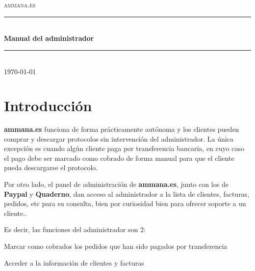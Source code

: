 \documentclass[12pt, spanish]{article}
\begin{document}

    \begin{titlepage}
        \newcommand { \HRule } { \rule {\linewidth} {0.5mm} }
        \center
        \textsc {\LARGE ammana.es} \\ [1.5cm]
        \HRule \\ [0.4cm]
        { \huge \bfseries Manual del administrador } \\ [0.4cm]
        \HRule \\ [1.5cm]
        { \large \today } \\ [3cm]
        \vfill
    \end{titlepage}


    \tableofcontents

    \newpage

    \section{Introducción}

        \textbf{ammana.es} funciona de forma prácticamente autónoma y los clientes pueden
        comprar y descargar protocolos sin intervención del administrador. La única
        excepción es cuando algún cliente paga por transferencia bancaria, en cuyo
        caso el pago debe ser marcado como cobrado de forma manual para que el cliente
        pueda descargarse el protocolo.

        Por otro lado, el panel de administración de \textbf{ammana.es}, junto con los de \textbf{Paypal} y
        \textbf{Quaderno}, dan acceso al administrador a la lista de clientes, facturas, pedidos, etc
        para su consulta, bien por curiosidad bien para ofrecer soporte a un cliente..

        Es decir, las funciones del administrador son 2:

        \begin{steps}
          \item Marcar como cobrados los pedidos que han sido pagados por transferencia
          \item Acceder a la información de clientes y facturas
        \end{steps}
\end{document}
